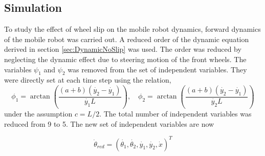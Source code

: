 \subsection{Simulation}
To study the effect of wheel slip on the mobile robot dynamics, forward dynamics of the mobile robot was carried out. 
A reduced order  of the dynamic  equation derived in section \ref{sec:DynamicNoSlip} was used.
 The order was reduced by  neglecting the dynamic effect due to steering motion of the front wheels. The  variables $\psi_1$ and $\psi_2$ was  removed  from the  set of independent variables. They were directly set  at each time step using the relation,
 \[\phi_1=\arctan\left( \frac{(a+b)(\dot{y_2}-\dot{y_1})}{\dot{y_1}L}\right) , \quad
 \phi_2=\arctan\left( \frac{(a+b)(\dot{y_2}-\dot{y_1})}{\dot{y_2}L  }\right) 
 \]
  under the assumption $c=L/2$.
The total number of independent variables  was  reduced from  9 to 5. The new set of independent variables are now

\begin{equation}
\label{eqn:theta_slip_reduced}
\dot{\theta}_{red}=(\dot{\theta_1},\dot{\theta_2}, \dot{y_1},\dot{y_2},\dot{x})^T
\end{equation} 

